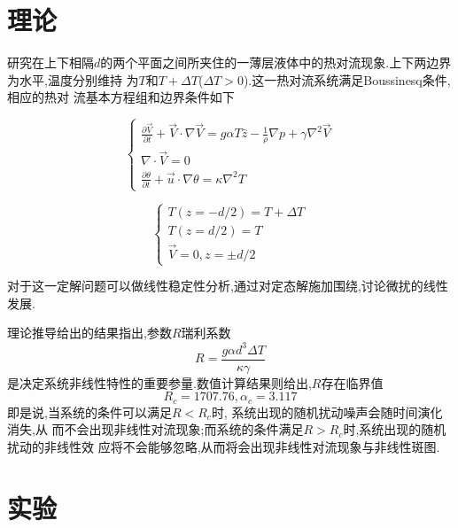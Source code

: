 \documentclass[a4paper]{article}
\begin{document}
\newpage
\section{理论} \label{theory}%
研究在上下相隔$d$的两个平面之间所夹住的一薄层液体中的热对流现象.上下两边界为水平,温度分别维持
为$T$和$T+\Delta T$($\Delta T > 0$).这一热对流系统满足Boussinesq条件,相应的热对
流基本方程组和边界条件如下

\begin{equation}
    \begin{cases}
        \frac{\partial \vec{V}}{\partial t} + \vec{V} \cdot \nabla\vec{V} =
        g\alpha T\hat{z} - \frac{1}{\rho}\nabla p + \gamma\nabla^2\vec{V} \\
        \nabla\cdot\vec{V} = 0 \\
        \frac{\partial \theta}{\partial t} + \vec{u}\cdot\nabla\theta =
        \kappa\nabla^2 T
    \end{cases}
\end{equation}

\begin{equation}
    \begin{cases}
        T(z = -d/2) = T + \Delta T \\
        T(z = d/2) = T \\
        \vec{V} = 0, z = \pm d/2
    \end{cases}
\end{equation}

对于这一定解问题可以做线性稳定性分析,通过对定态解施加围绕,讨论微扰的线性发展.

理论推导给出的结果指出,参数$R$瑞利系数
\begin{equation}
    R = \frac{g\alpha d^3\Delta T}{\kappa\gamma}
\end{equation}
是决定系统非线性特性的重要参量.数值计算结果则给出,$R$存在临界值
\begin{equation}
    R_c = 1707.76, \alpha_c = 3.117
\end{equation}
即是说,当系统的条件可以满足$R<R_c$时, 系统出现的随机扰动噪声会随时间演化消失,从
而不会出现非线性对流现象;而系统的条件满足$R>R_c$时,系统出现的随机扰动的非线性效
应将不会能够忽略,从而将会出现非线性对流现象与非线性斑图.
\newpage
\section{实验} \label{experiment}%
\end{document}
